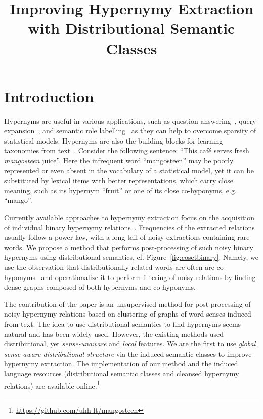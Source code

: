 \documentclass[10pt, a4paper]{article}
\title{\textbf{Improving Hypernymy Extraction with Distributional Semantic Classes}}
\begin{document}
\setlength{\abovedisplayskip}{3pt}
\setlength{\belowdisplayskip}{3pt}

\maketitleabstract

\section{Introduction}

Hypernyms are useful in various applications, such as question answering~\cite{Zhou:13}, query expansion~\cite{gong2005web},  and semantic role labelling~\cite{shi2005putting}
as they can help to overcome sparsity of statistical models. Hypernyms are also the building blocks for learning taxonomies from text~\cite{bordea2016semeval}. Consider the following sentence: ``This caf\'e serves fresh \textit{mangosteen} juice''. Here the infrequent word ``mangosteen'' may be poorly represented or even absent in the vocabulary of a statistical model, yet it can be substituted by lexical items with better representations, which carry close meaning, such as its hypernym ``fruit'' or one of its close co-hyponyms, e.g. ``mango''. 

Currently available approaches to hypernymy extraction focus on the acquisition of individual binary hypernymy relations~\cite{hearst1992automatic,snow2004learning,weeds2014learning,shwartz-goldberg-dagan:2016:P16-1,glavavs-ponzetto:2017:EMNLP2017}. Frequencies of the extracted relations usually follow a power-law, with a long tail of noisy extractions containing rare words. We propose a method that performs post-processing of such noisy binary hypernyms using distributional semantics, cf. Figure~\ref{fig:cosetbinary}. Namely, we use the observation that distributionally related words are often are co-hyponyms~\cite{wandmacher2005semantic,Heylen:08} and operationalize it to perform filtering of noisy relations by finding dense graphs composed of both hypernyms and co-hyponyms.  
 
The contribution of the paper is an unsupervised method for post-processing of noisy hypernymy relations based on  clustering of graphs of word senses induced from text. The idea to use distributional semantics to find hypernyms seems natural and has been widely used. However, the existing methods used distributional, yet \textit{sense-unaware} and \textit{local} features. We are the first to use \textit{global sense-aware distributional structure} via the induced semantic classes to improve hypernymy extraction. The implementation of our method and the induced language resources (distributional semantic classes and cleansed hypernymy relations) are available online.\footnote{\url{https://github.com/uhh-lt/mangosteen}}
\end{document}
